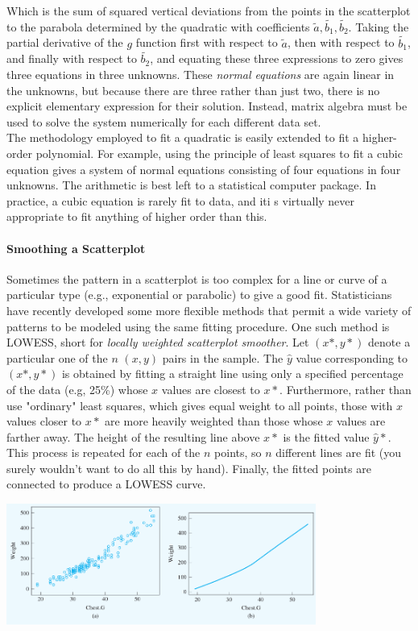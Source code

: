 \documentclass{article}
\newcommand{\p}[1]{\paragraph{#1}} %
\begin{document}
		Which is the sum of squared vertical deviations from the points in the scatterplot to the 
		parabola determined by the quadratic with coefficients $\tilde{a},\tilde{b_1},\tilde{b_2}$. 
		Taking the partial derivative of the $g$ function first with respect to $\tilde{a}$, then with 
		respect to $\tilde{b_1}$, and finally with respect to $\tilde{b_2}$, and equating these three 
		expressions to zero gives three equations in three unknowns. These \textit{normal 
		equations} are again linear in the unknowns, but because there are three rather than just 
		two, there is no explicit elementary expression for their solution. Instead, matrix algebra 
		must be used to solve the system numerically for each different data set. \\
		
		The methodology employed to fit a quadratic is easily extended to fit a higher-order 
		polynomial. For example, using the principle of least squares to fit a cubic equation gives 
		a system of normal equations consisting of four equations in four unknowns. The 
		arithmetic is best left to a statistical computer package. In practice, a cubic equation is 
		rarely fit to data, and iti s virtually never appropriate to fit anything of higher order than 
		this.
		
	\p{Smoothing a Scatterplot}
		Sometimes the pattern in a scatterplot is too complex for a line or curve of a particular 
		type (e.g., exponential or parabolic) to give a good fit. Statisticians have recently 
		developed some more flexible methods that permit a wide variety of patterns to be 
		modeled using the same fitting procedure. One such method is LOWESS, short for 
		\textit{locally weighted scatterplot smoother}. Let $(x\ast,y\ast)$ denote a particular one of 
		the $n$ $(x,y)$ pairs in the sample. The $\hat{y}$ value corresponding to $(x\ast,y\ast)$ 
		is obtained by fitting a straight line using only a specified percentage of the data (e.g, 
		25\%) whose $x$ values are closest to $x\ast$. Furthermore, rather than use "ordinary" 
		least squares, which gives equal weight to all points, those with $x$ values closer to $x
		\ast$ are more heavily weighted than those whose $x$ values are farther away. The 
		height of the resulting line above $x\ast$ is the fitted value $\hat{y}\ast$. This process is 
		repeated for each of the $n$ points, so $n$ different lines are fit (you surely wouldn't want 
		to do all this by hand). Finally, the fitted points are connected to produce a LOWESS 
		curve.
		
		\begin{center}
			\includegraphics[width=4in]{lowess_example.jpg}
		\end{center}
	
\end{document}

